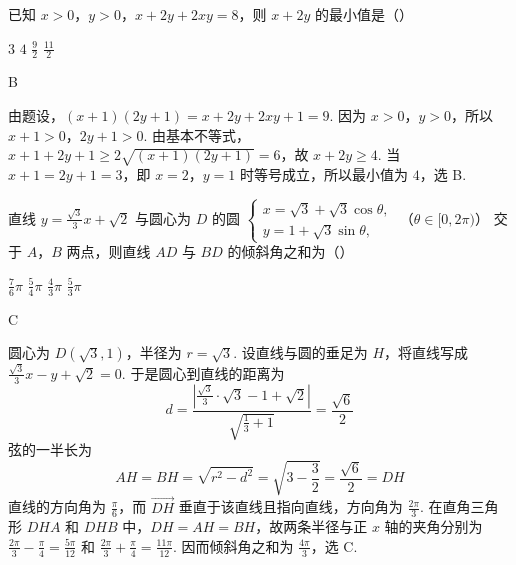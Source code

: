 \begin{problem}
已知 \(x > 0\)，\(y > 0\)，\(x + 2y + 2xy = 8\)，则 \(x + 2y\) 的最小值是（\quad）

\choices
    {\(3\)}
    {\(4\)}
    {\( \frac{9}{2} \)}
    {\(\frac{11}{2}\)}

\begin{answer}
B
\end{answer}

\begin{solution}
由题设，\((x+1)(2y+1)=x+2y+2xy+1=9\). 因为 \(x>0\)，\(y>0\)，所以 \(x+1>0\)，\(2y+1>0\). 由基本不等式，\(x+1+2y+1\geqslant2\sqrt{(x+1)(2y+1)}=6\)，故 \(x+2y\geqslant4\). 当 \(x+1=2y+1=3\)，即 \(x=2\)，\(y=1\) 时等号成立，所以最小值为 \(4\)，选 B.
\end{solution}
\end{problem}

\begin{problem}
直线 \( y = \frac{\sqrt{3}}{3} x + \sqrt{2} \) 与圆心为 \(D\) 的圆 \( \begin{cases}
x = \sqrt{3} + \sqrt{3}\cos \theta,\\
y = 1 + \sqrt{3}\sin \theta,
\end{cases}\) （\(\theta \in [0,2\pi)\)） 交于 \(A\)，\(B\) 两点，则直线 \(AD\) 与 \(BD\) 的倾斜角之和为（\quad）

\choices
    {\(\frac{7}{6}\pi\)}
    {\(\frac{5}{4}\pi\)}
    {\(\frac{4}{3}\pi\)}
    {\(\frac{5}{3}\pi\)}

\begin{answer}
C
\end{answer}

\begin{solution}
圆心为 \(D(\sqrt{3},1)\)，半径为 \(r=\sqrt{3}\). 设直线与圆的垂足为 \(H\)，将直线写成 \(\frac{\sqrt{3}}{3}x-y+\sqrt{2}=0\). 于是圆心到直线的距离为
\[
d=\frac{\left|\frac{\sqrt{3}}{3}\cdot\sqrt{3}-1+\sqrt{2}\right|}{\sqrt{\frac13+1}}=\frac{\sqrt{6}}{2}
\]
弦的一半长为
\[
AH=BH=\sqrt{r^2-d^2}=\sqrt{3-\frac32}=\frac{\sqrt{6}}2=DH
\]
直线的方向角为 \(\frac\pi6\)，而 \(\overrightarrow{DH}\) 垂直于该直线且指向直线，方向角为 \(\frac{2\pi}{3}\). 在直角三角形 \(DHA\) 和 \(DHB\) 中，\(DH=AH=BH\)，故两条半径与正 \(x\) 轴的夹角分别为 \(\frac{2\pi}{3}-\frac\pi4=\frac{5\pi}{12}\) 和 \(\frac{2\pi}{3}+\frac\pi4=\frac{11\pi}{12}\). 因而倾斜角之和为 \(\frac{4\pi}{3}\)，选 C.
\end{solution}
\end{problem}

